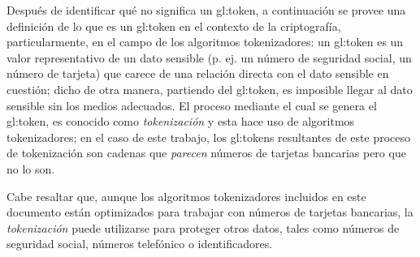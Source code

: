 Después de identificar qué no significa un \gls{gl:token}, a continuación se
provee una definición de lo que es un \gls{gl:token} en el contexto de la
criptografía, particularmente, en el campo de los algoritmos tokenizadores: un
\gls{gl:token} es un valor representativo de un dato sensible (p. ej. un
número de seguridad social, un número de tarjeta) que carece de una relación
directa con el dato sensible en cuestión; dicho de otra manera, partiendo del
\gls{gl:token}, es imposible llegar al dato sensible sin los medios adecuados.
El proceso mediante el cual se genera el \gls{gl:token}, es conocido como
\textit{tokenización} y esta hace uso de algoritmos tokenizadores; en el caso
de este trabajo, los \glspl{gl:token} resultantes de este proceso de
tokenización son cadenas que \textit{parecen} números de tarjetas bancarias
pero que no lo son.

Cabe resaltar que, aunque los algoritmos tokenizadores incluidos en este
documento están optimizados para trabajar con números de tarjetas bancarias,
la \textit{tokenización} puede utilizarse para proteger otros datos, tales
como números de seguridad social, números telefónico o identificadores.
